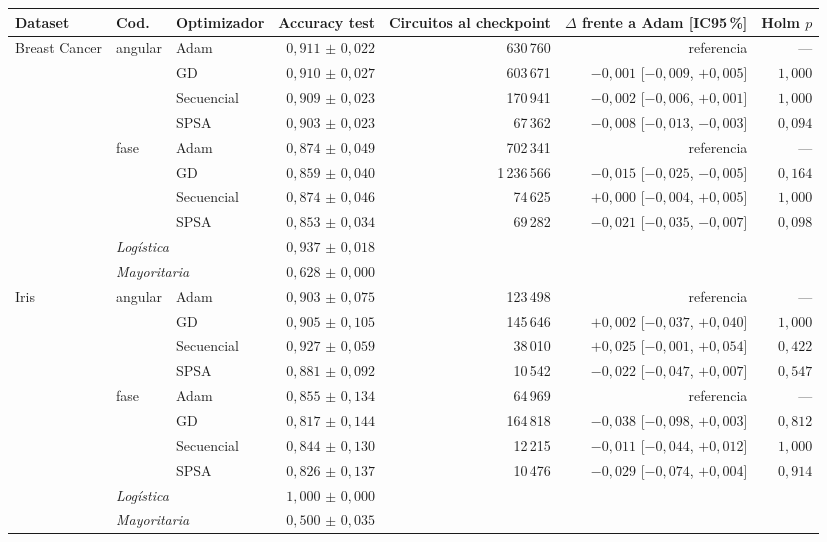 \begin{tabular}{lllrrrr}
\toprule
Dataset & Cod. & Optimizador & Accuracy test & Circuitos al checkpoint & $\Delta$ frente a Adam [IC95\,\%] & Holm $p$ \\
\midrule
Breast Cancer & angular & Adam & $0{,}911$ $\pm$ $0{,}022$ & 630\,760 & referencia & --- \\
 &  & GD & $0{,}910$ $\pm$ $0{,}027$ & 603\,671 & $-0{,}001$ [$-0{,}009$, $+0{,}005$] & $1{,}000$ \\
 &  & Secuencial & $0{,}909$ $\pm$ $0{,}023$ & 170\,941 & $-0{,}002$ [$-0{,}006$, $+0{,}001$] & $1{,}000$ \\
 &  & SPSA & $0{,}903$ $\pm$ $0{,}023$ & 67\,362 & $-0{,}008$ [$-0{,}013$, $-0{,}003$] & $0{,}094$ \\
\addlinespace
 & fase & Adam & $0{,}874$ $\pm$ $0{,}049$ & 702\,341 & referencia & --- \\
 &  & GD & $0{,}859$ $\pm$ $0{,}040$ & 1\,236\,566 & $-0{,}015$ [$-0{,}025$, $-0{,}005$] & $0{,}164$ \\
 &  & Secuencial & $0{,}874$ $\pm$ $0{,}046$ & 74\,625 & $+0{,}000$ [$-0{,}004$, $+0{,}005$] & $1{,}000$ \\
 &  & SPSA & $0{,}853$ $\pm$ $0{,}034$ & 69\,282 & $-0{,}021$ [$-0{,}035$, $-0{,}007$] & $0{,}098$ \\
\addlinespace
 & \multicolumn{2}{l}{\emph{Logística}} & $0{,}937$ $\pm$ $0{,}018$ & & & \\
 & \multicolumn{2}{l}{\emph{Mayoritaria}} & $0{,}628$ $\pm$ $0{,}000$ & & & \\
\midrule
Iris & angular & Adam & $0{,}903$ $\pm$ $0{,}075$ & 123\,498 & referencia & --- \\
 &  & GD & $0{,}905$ $\pm$ $0{,}105$ & 145\,646 & $+0{,}002$ [$-0{,}037$, $+0{,}040$] & $1{,}000$ \\
 &  & Secuencial & $0{,}927$ $\pm$ $0{,}059$ & 38\,010 & $+0{,}025$ [$-0{,}001$, $+0{,}054$] & $0{,}422$ \\
 &  & SPSA & $0{,}881$ $\pm$ $0{,}092$ & 10\,542 & $-0{,}022$ [$-0{,}047$, $+0{,}007$] & $0{,}547$ \\
\addlinespace
 & fase & Adam & $0{,}855$ $\pm$ $0{,}134$ & 64\,969 & referencia & --- \\
 &  & GD & $0{,}817$ $\pm$ $0{,}144$ & 164\,818 & $-0{,}038$ [$-0{,}098$, $+0{,}003$] & $0{,}812$ \\
 &  & Secuencial & $0{,}844$ $\pm$ $0{,}130$ & 12\,215 & $-0{,}011$ [$-0{,}044$, $+0{,}012$] & $1{,}000$ \\
 &  & SPSA & $0{,}826$ $\pm$ $0{,}137$ & 10\,476 & $-0{,}029$ [$-0{,}074$, $+0{,}004$] & $0{,}914$ \\
\addlinespace
 & \multicolumn{2}{l}{\emph{Logística}} & $1{,}000$ $\pm$ $0{,}000$ & & & \\
 & \multicolumn{2}{l}{\emph{Mayoritaria}} & $0{,}500$ $\pm$ $0{,}035$ & & & \\
\bottomrule
\end{tabular}
